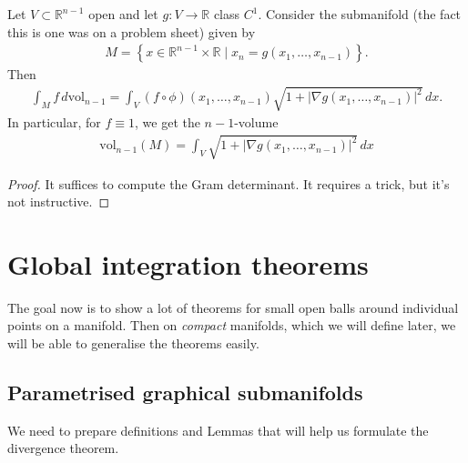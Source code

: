 
\begin{prop}\label{prop:int-graph-subm}
	Let $V \subset \mathbb{R}^{n-1}$ open and let $g: V \to \mathbb{R}$ class $C^{1}$. Consider the submanifold (the fact this is one was on a problem sheet) given by
	\begin{align*}
		M = \left\{ x \in \mathbb{R}^{n-1} \times \mathbb{R} \mid x_{n} = g(x_{1}, \dots, x_{n-1}) \right\}.
	\end{align*}
	Then
	\begin{align*}
		\int_{M}^{} f \, d \text{vol}_{n-1} = \int_{V}^{} (f \circ \phi)(x_{1}, \dots, x_{n-1}) \sqrt{1+\left|  \nabla g(x_{1}, \dots, x_{n-1})\right|^{2} } \, dx.
	\end{align*}
	In particular, for $f \equiv 1$, we get the $n-1$-volume
	\begin{align*}
		\text{vol}_{n-1}(M) = \int_{V}^{} \sqrt{1+ \left| \nabla g(x_{1}, \dots, x_{n-1}) \right|^{2}} \, dx
	\end{align*}
\end{prop}
\begin{proof}
	It suffices to compute the Gram determinant. It requires a trick, but it's not instructive.
\end{proof}

\chapter{Global integration theorems}

The goal now is to show a lot of theorems for small open balls around individual points on a manifold. Then on \textit{compact} manifolds, which we will define later, we will be able to generalise the theorems easily.

\section{Parametrised graphical submanifolds}

We need to prepare definitions and Lemmas that will help us formulate the divergence theorem.

